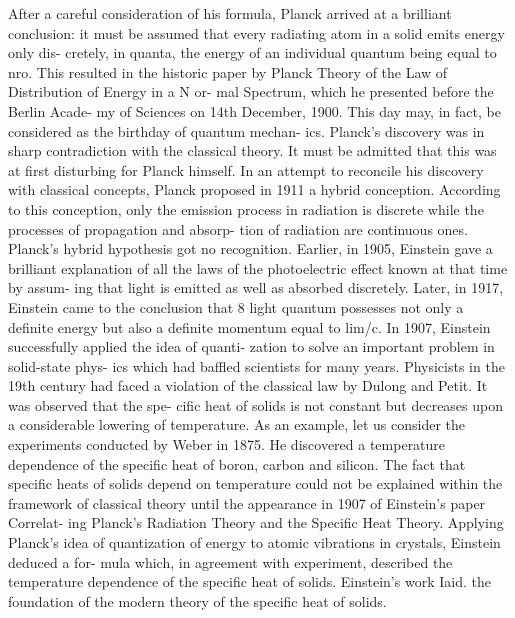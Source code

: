 \documentclass[a4paper,sfsidenotes,colorlinks=true]{tufte-book}
\numberwithin{equation}{section}
\numberwithin{figure}{section}
\begin{document}
{{{{{{After a careful consideration of his formula, Planck arrived at a brilliant conclusion: it must be assumed that every radiating atom in a solid emits energy only dis- cretely, in quanta, the energy of an individual quantum being equal to nro. This resulted in the historic paper by Planck Theory of the Law of Distribution of Energy in a N or- mal Spectrum, which he presented before the Berlin Acade- my of Sciences on 14th December, 1900. This day may, in fact, be considered as the birthday of quantum mechan- ics.
Planck's discovery was in sharp contradiction with the classical theory. It must be admitted that this was at first disturbing for Planck himself. In an attempt to reconcile his discovery with classical concepts, Planck proposed in 1911 a hybrid conception. According to this conception, only the emission process in radiation is discrete while the processes of propagation and absorp- tion of radiation are continuous ones.
Planck's hybrid hypothesis got no recognition. Earlier, in 1905, Einstein gave a brilliant explanation of all the laws of the photoelectric effect known at that time by assum- ing that light is emitted as well as absorbed discretely. Later, in 1917, Einstein came to the conclusion that 8 light quantum possesses not only a definite energy but also a definite momentum equal to lim/c.
In 1907, Einstein successfully applied the idea of quanti- zation to solve an important problem in solid-state phys- ics which had baffled scientists for many years. Physicists
in the 19th century had faced a violation of the classical law by Dulong and Petit. It was observed that the spe- cific heat of solids is not constant but decreases upon a considerable lowering of temperature. As an example, let us consider the experiments conducted by Weber in 1875. He discovered a temperature dependence of the specific heat of boron, carbon and silicon. The fact that specific heats of solids depend on temperature could not be explained within the framework of classical theory until the appearance in 1907 of Einstein's paper Correlat- ing Planck's Radiation Theory and the Specific Heat Theory. Applying Planck's idea of quantization of energy to atomic vibrations in crystals, Einstein deduced a for- mula which, in agreement with experiment, described the temperature dependence of the specific heat of solids. Einstein's work Iaid. the foundation of the modern theory of the specific heat of solids.
}}}}}}
\end{document}
